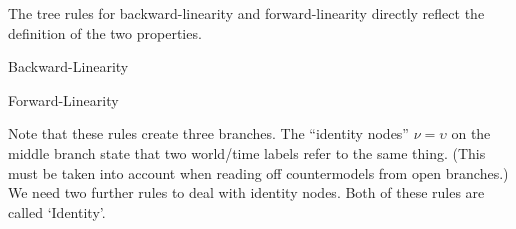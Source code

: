 
The tree rules for backward-linearity and forward-linearity directly reflect the
definition of the two properties.
\bigskip
\begin{center}

  \begin{minipage}[t]{0.4\textwidth} \centering
    Backward-Linearity
    
    \tree[2]{
      & \barenode{$\nu < \omega$} & \\
      & \dotbelowbaretribnode{$\upsilon < \omega$} & \\
      && \\
      && \\
      \barenode{$\nu < \upsilon$} & \barenode{$\nu = \upsilon$} & \barenode{$\upsilon < \nu$}
    }
  \end{minipage}
  \begin{minipage}[t]{0.4\textwidth} \centering
    Forward-Linearity

    \tree[2]{
      & \barenode{$\omega < \nu$} & \\
      & \dotbelowbaretribnode{$\omega < \upsilon$} & \\
      && \\
      && \\
      \barenode{$\nu < \upsilon$} & \barenode{$\nu = \upsilon$} & \barenode{$\upsilon < \nu$}
    }
  \end{minipage}
\end{center}
\bigskip%
Note that these rules create three branches. The ``identity nodes''
$\nu = \upsilon$ on the middle branch state that two world/time labels refer to
the same thing. (This must be taken into account when reading off countermodels
from open branches.) We need two further rules to deal with identity nodes. Both
of these rules are called `Identity'.%
\bigskip
\begin{center}
  \begin{minipage}[t]{0.3\textwidth} \centering
    
  \end{minipage}
  \begin{minipage}[t]{0.3\textwidth} \centering

  \end{minipage}
\end{center}

